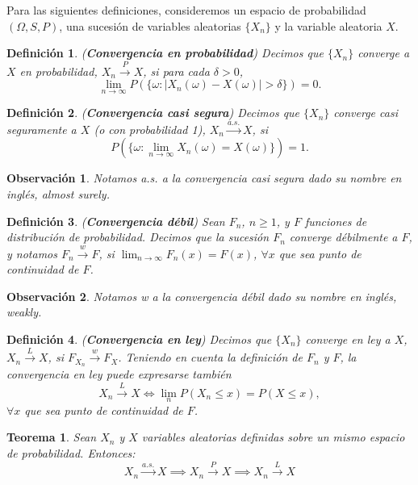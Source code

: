 \documentclass{report}
\newtheorem{thm}{Teorema}[section]
\newtheorem{dfn}{Definición}[section]
\newtheorem{obs}{Observación}[section]
\begin{document}
Para las siguientes definiciones, consideremos un espacio de probabilidad $(\Omega, S, P)$,
una sucesión de variables aleatorias $\{X_n\}$ y la variable aleatoria $X$.

\begin{dfn} \label{dfn:conv_prob} (\textbf{Convergencia en probabilidad})
    Decimos que $\{X_n\}$ converge a $X$ en probabilidad, $X_n \xrightarrow{P} X$, si para cada $\delta > 0$,
\[
\lim_{n\rightarrow \infty} P\left(\{\omega : |X_n(\omega) - X(\omega)| > \delta \}\right) = 0.
\]
\end{dfn}

\begin{dfn} \label{dfn:conv_cs}(\textbf{Convergencia casi segura}) Decimos que $\{X_n\}$ converge casi seguramente a $X$ (o con probabilidad 1), $X_n \xrightarrow{a.s.} X$, si
\[
P(\{\omega : \lim_{n\rightarrow \infty} X_n(\omega) = X(\omega)\}) = 1.
\]
\end{dfn}
\begin{obs}
    Notamos \emph{a.s.} a la convergencia casi segura dado su nombre en inglés, \emph{almost surely}.
\end{obs}

\begin{dfn} \label{dfn:conv_debil} (\textbf{Convergencia débil}) Sean $F_n$, $n \geq 1$, y
    $F$ funciones de distribución de probabilidad. Decimos que la sucesión $F_n$ converge \emph{débilmente} a $F$, y notamos $F_n \xrightarrow{w} F$,
    si $\displaystyle\lim_{n\rightarrow\infty} F_n(x) = F(x)$, $\forall x$ que sea punto de continuidad de $F$.
\end{dfn}

\begin{obs}
    Notamos \emph{w} a la convergencia débil dado su nombre en inglés, \emph{weakly}.
\end{obs}


\begin{dfn} \label{dfn:conv_ley} (\textbf{Convergencia en ley}) Decimos que $\{X_n\}$ converge en ley a $X$,
    $X_n \xrightarrow{L} X$, si $F_{X_n} \xrightarrow{w} F_X$. Teniendo en cuenta la definición de $F_n$ y $F$, la convergencia en ley puede expresarse también
\[
X_n \xrightarrow{L} X \iff \lim_n P(X_n \leq x) = P(X \leq x),
\]
$\forall x$ que sea punto de continuidad de $F$.
\end{dfn}


\begin{thm} \label{thm:rel_convergencias}  Sean $X_n$ y $X$ variables aleatorias definidas sobre un mismo espacio de probabilidad. Entonces:
\[
X_n \xrightarrow{a.s.} X \implies X_n \xrightarrow{P} X \implies X_n \xrightarrow{L} X
\]
\end{thm}
\end{document}
